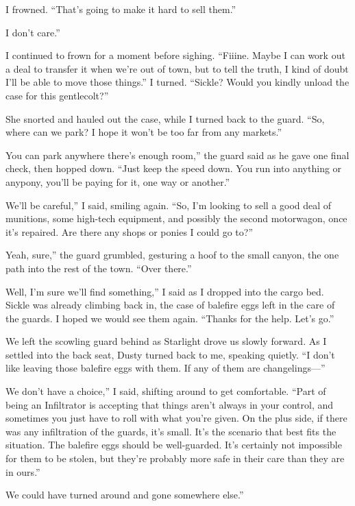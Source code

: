 I frowned. “That’s going to make it hard to sell them.”

\leavevmode{}I don’t care.”

I continued to frown for a moment before sighing. “Fiiine. Maybe I can work out a deal to transfer it when we’re out of town, but to tell the truth, I kind of doubt I’ll be able to move those things.” I turned. “Sickle? Would you kindly unload the case for this gentlecolt?”

She snorted and hauled out the case, while I turned back to the guard. “So, where can we park? I hope it won’t be too far from any markets.”

\leavevmode{}You can park anywhere there’s enough room,” the guard said as he gave one final check, then hopped down. “Just keep the speed down. You run into anything or anypony, you’ll be paying for it, one way or another.”

\leavevmode{}We’ll be careful,” I said, smiling again. “So, I’m looking to sell a good deal of munitions, some high-tech equipment, and possibly the second motorwagon, once it’s repaired. Are there any shops or ponies I could go to?”

\leavevmode{}Yeah, sure,” the guard grumbled, gesturing a hoof to the small canyon, the one path into the rest of the town. “Over there.”

\leavevmode{}Well, I’m sure we’ll find something,” I said as I dropped into the cargo bed. Sickle was already climbing back in, the case of balefire eggs left in the care of the guards. I hoped we would see them again. “Thanks for the help. Let’s go.”

We left the scowling guard behind as Starlight drove us slowly forward. As I settled into the back seat, Dusty turned back to me, speaking quietly. “I don’t like leaving those balefire eggs with them. If any of them are changelings—”

\leavevmode{}We don’t have a choice,” I said, shifting around to get comfortable. “Part of being an Infiltrator is accepting that things aren’t always in your control, and sometimes you just have to roll with what you’re given. On the plus side, if there was any infiltration of the guards, it’s small. It’s the scenario that best fits the situation. The balefire eggs should be well-guarded. It’s certainly not impossible for them to be stolen, but they’re probably more safe in their care than they are in ours.”

\leavevmode{}We could have turned around and gone somewhere else.”


